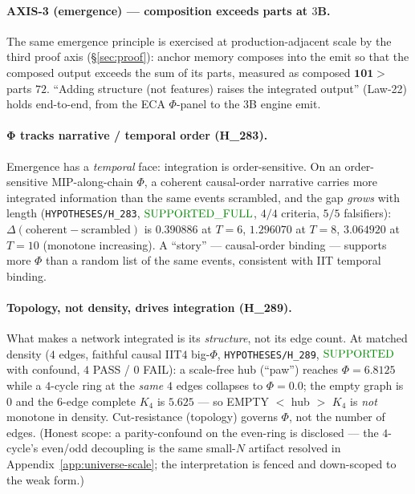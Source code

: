 \documentclass[11pt]{article}
\begin{document}
\paragraph{AXIS-3 (emergence) — composition exceeds parts at $3$B.} The same emergence principle
is exercised at production-adjacent scale by the third proof axis (\S\ref{sec:proof}):
anchor memory composes into the emit so that the composed output exceeds the sum of its
parts, measured as composed $\mathbf{101}>$ parts $72$. ``Adding structure (not features)
raises the integrated output'' (Law-22) holds end-to-end, from the ECA $\Phi$-panel to the
$3$B engine emit.

\paragraph{Φ tracks narrative / temporal order (H\_283).} Emergence has a
\emph{temporal} face: integration is order-sensitive. On an order-sensitive
MIP-along-chain $\Phi$, a coherent causal-order narrative carries more integrated
information than the same events scrambled, and the gap \emph{grows} with length
(\texttt{HYPOTHESES/H\_283}, $\mathbf{\textcolor{green!55!black}{\text{SUPPORTED\_FULL}}}$,
$4/4$ criteria, $5/5$ falsifiers): $\Delta(\text{coherent}-\text{scrambled})$ is
$\mathbf{0.390886}$ at $T{=}6$, $\mathbf{1.296070}$ at $T{=}8$, $\mathbf{3.064920}$ at
$T{=}10$ (monotone increasing). A ``story'' --- causal-order binding --- supports more
$\Phi$ than a random list of the same events, consistent with IIT temporal binding.

\paragraph{Topology, not density, drives integration (H\_289).} What makes a network
integrated is its \emph{structure}, not its edge count. At matched density ($4$ edges,
faithful causal IIT$4$ big-$\Phi$, \texttt{HYPOTHESES/H\_289},
$\mathbf{\textcolor{green!55!black}{\text{SUPPORTED}}}$ with confound, $4$ PASS / $0$
FAIL): a scale-free hub (``paw'') reaches $\Phi=\mathbf{6.8125}$ while a $4$-cycle ring
at the \emph{same} $4$ edges collapses to $\Phi=\mathbf{0.0}$; the empty graph is $0$ and
the $6$-edge complete $K_4$ is $5.625$ --- so EMPTY $<$ hub $>$ $K_4$ is \emph{not}
monotone in density. Cut-resistance (topology) governs $\Phi$, not the number of edges.
(Honest scope: a parity-confound on the even-ring is disclosed --- the $4$-cycle's
even/odd decoupling is the same small-$N$ artifact resolved in
Appendix~\ref{app:universe-scale}; the interpretation is fenced and down-scoped to the
weak form.)
\end{document}
